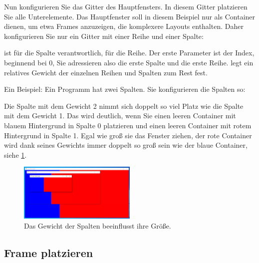 Nun konfigurieren Sie das Gitter des Hauptfensters. In diesem Gitter platzieren Sie alle Unterelemente. Das Hauptfenster soll in diesem Beispiel nur als Container dienen, um etwa Frames anzuzeigen, die komplexere Layouts enthalten. Daher konfigurieren Sie nur ein Gitter mit einer Reihe und einer Spalte:

\medskip



\medskip

 ist für die Spalte verantwortlich,  für die Reihe. Der erste Parameter ist der Index, beginnend bei 0, Sie adressieren also die erste Spalte und die erste Reihe.  legt ein relatives Gewicht der einzelnen Reihen und Spalten zum Rest fest.

Ein Beispiel: Ein Programm hat zwei Spalten. Sie konfigurieren die Spalten so:

\medskip



\medskip

Die Spalte mit dem Gewicht 2 nimmt sich doppelt so viel Platz wie die Spalte mit dem Gewicht 1. Das wird deutlich, wenn Sie einen leeren Container mit blauem Hintergrund in Spalte 0 platzieren und einen leeren Container mit rotem Hintergrund in Spalte 1. Egal wie groß sie das Fenster ziehen, der rote Container wird dank seines Gewichts immer doppelt so groß sein wie der blaue Container, siehe \ref{TkinterWeights}.


\begin{figure}
    \includegraphics[width=0.5\textwidth]{Images/TKinter/TkinterWeights}
    \caption{Das Gewicht der Spalten beeinflusst ihre Größe.} \label{TkinterWeights}
\end{figure}


\subsection{Frame platzieren}

